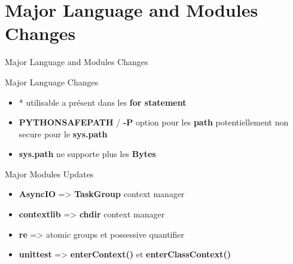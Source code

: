 \documentclass[aspectratio=169, xetex, 12pt]{beamer}
\begin{document}
    \section{Major Language and Modules Changes}
    \begin{frame}{Major Language and Modules Changes}
        \begin{block}{Major Language Changes}
            \begin{itemize}
                \item * utilisable a présent dans les \textbf{for statement}
                \item \textbf{PYTHONSAFEPATH} / \textbf{-P} option pour les \textbf{path} potentiellement
                non secure pour le \textbf{sys.path}
                \item \textbf{sys.path} ne supporte plus les \textbf{Bytes}
            \end{itemize}
        \end{block}
        \begin{block}{Major Modules Updates}
            \begin{itemize}
                \item \textbf{AsyncIO} => \textbf{TaskGroup} context manager
                \item \textbf{contextlib} => \textbf{chdir} context manager
                \item \textbf{re} => atomic groups et possessive quantifier
                \item \textbf{unittest} => \textbf{enterContext()} et \textbf{enterClassContext()}
            \end{itemize}
        \end{block}
    \end{frame}
\end{document}
